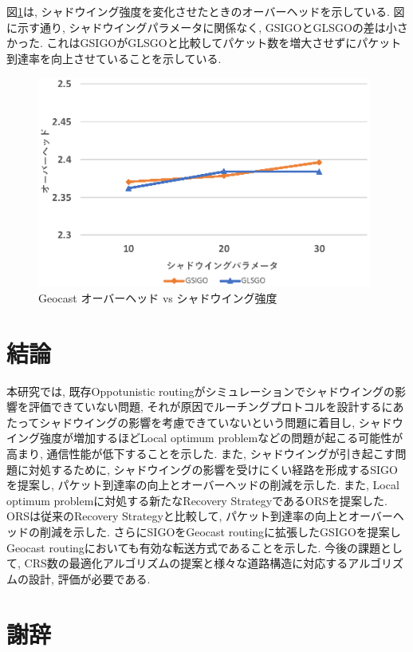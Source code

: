 \documentclass[10pt]{jreport}
\begin{document}
図\ref{fig:GSIGO_overhead_shadow}は, シャドウイング強度を変化させたときのオーバーヘッドを示している.
図に示す通り, シャドウイングパラメータに関係なく, GSIGOとGLSGOの差は小さかった. これはGSIGOがGLSGOと比較してパケット数を増大させずにパケット到達率を向上させていることを示している.

\begin{figure}[!ht]
	\centering
	\includegraphics[width=110mm]{figures/GSIGO_overhead_shadow.eps}
	\caption{Geocast オーバーヘッド vs シャドウイング強度}
	\label{fig:GSIGO_overhead_shadow}
\end{figure}




\chapter{結論}
\label{Conclusion}
本研究では, 既存Oppotunistic routingがシミュレーションでシャドウイングの影響を評価できていない問題, それが原因でルーチングプロトコルを設計するにあたってシャドウイングの影響を考慮できていないという問題に着目し, シャドウイング強度が増加するほどLocal optimum problemなどの問題が起こる可能性が高まり, 通信性能が低下することを示した. また, シャドウイングが引き起こす問題に対処するために, シャドウイングの影響を受けにくい経路を形成するSIGOを提案し, パケット到達率の向上とオーバーヘッドの削減を示した. また, Local optimum problemに対処する新たなRecovery StrategyであるORSを提案した. ORSは従来のRecovery Strategyと比較して, パケット到達率の向上とオーバーヘッドの削減を示した. さらにSIGOをGeocast routingに拡張したGSIGOを提案しGeocast routingにおいても有効な転送方式であることを示した. 今後の課題として, CRS数の最適化アルゴリズムの提案と様々な道路構造に対応するアルゴリズムの設計, 評価が必要である.


\chapter*{謝辞}
\sloppy 
\end{document}
